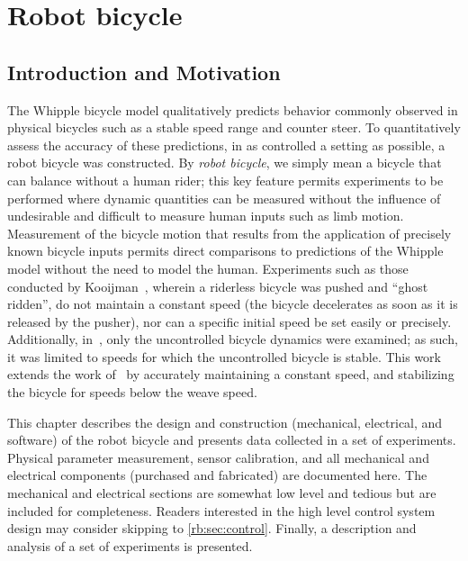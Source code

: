 \chapter{Robot bicycle} \label{chapter4}

\section{Introduction and Motivation} \label{rb:sec:intro}

The Whipple bicycle model qualitatively predicts behavior commonly observed in
physical bicycles such as a stable speed range and counter steer. To
quantitatively assess the accuracy of these predictions, in as controlled a
setting as possible, a robot bicycle was constructed. By \textit{robot
bicycle}, we simply mean a bicycle that can balance without a human rider; this key
feature permits experiments to be performed where dynamic quantities can be
measured without the influence of undesirable and difficult to measure human
inputs such as limb motion. Measurement of the bicycle motion that results from
the application of precisely known bicycle inputs permits direct comparisons to
predictions of the Whipple model without the need to model the human.
Experiments such as those conducted by Kooijman~\cite{Kooijman2007}, wherein a
riderless bicycle was pushed and ``ghost ridden'', do not maintain a constant
speed (the bicycle decelerates as soon as it is released by the pusher), nor
can a specific initial speed be set easily or precisely. Additionally,
in~\cite{Kooijman2007}, only the uncontrolled bicycle dynamics were examined;
as such, it was limited to speeds for which the uncontrolled bicycle is stable.
This work extends the work of~\cite{Kooijman2007} by accurately maintaining a
constant speed, and stabilizing the bicycle for speeds below the weave speed.


This chapter describes the design and construction (mechanical, electrical, and
software) of the robot bicycle and presents data collected in a set of experiments.
Physical parameter measurement, sensor calibration, and all mechanical and
electrical components (purchased and fabricated) are documented here. The
mechanical and electrical sections are somewhat low level and tedious but are
included for completeness. Readers interested in the high level control system
design may consider skipping to \autoref{rb:sec:control}. Finally, a
description and analysis of a set of experiments is presented.


